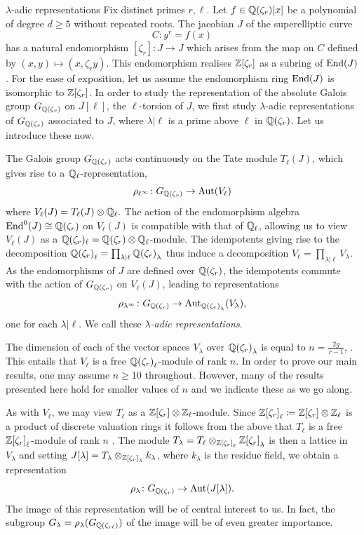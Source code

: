 \documentclass[11pt,a4paper]{article}
\newcommand{\Qr}{{\QQ(\zeta_r)}}
\newcommand{\Zr}{{\ZZ[\zeta_r]}}
\newcommand{\GQr}{G_{\QQ(\zeta_{r})}}
\newcommand{\GQrl}{G_{\QQ(\zeta_{r\ell})}}
\newcommand{\zr}{\zeta_r}
\newcommand{\Glam}{G_{\lambda}}
\begin{document}
\begin{section}{$\lambda$-adic representations}
\label{section_lambda_adic_reps}
Fix distinct primes $r , \ell$. Let $f \in \Qr[x]$ be a polynomial  of degree $d \geq 5$ without repeated roots. The jacobian $J$ of the superelliptic curve
$$C \colon y^r = f(x)$$
has a natural endomorphism $[\zr]\colon J \rightarrow J$ which arises from the map on $C$ defined by $(x,y) \mapsto (x,\zr y)$.
This endomorphism realises $\ZZ[\zr]$ as a subring of $\End(J)$.
For the ease of exposition, let us assume the endomorphism ring $\End(J)$ is isomorphic to $\Zr$.
In order to study the representation of the absolute Galois group $\GQr$ on $J[\ell]$, the $\ell$-torsion of $J$, we first study $\lambda$-adic representations of $\GQr$ associated to $J$, where $\lambda|\ell$ is a prime above $\ell$ in $\Qr$. Let us introduce these now.

The Galois group $\GQr$ acts continuously on the Tate module $T_\ell(J)$, which gives rise to a $\mathbb{Q}_\ell$-representation,
$$\rho_{\ell^\infty}  \colon \GQr \rightarrow \Aut(V_\ell) $$
where $V_\ell(J) = T_\ell(J) \otimes \mathbb{Q}_\ell.$
The action of the endomorphism algebra $\End^0(J) \cong \QQ(\zeta_r)$ on $V_\ell(J)$ is compatible with that of $\mathbb{Q}_\ell$, allowing us to view $V_\ell(J)$ as a $\QQ(\zeta_r)_\ell = \Qr \otimes \Ql$-module.
The idempotents giving rise to the decomposition $\Qr_\ell = \prod_{\lambda | \ell} \Qr_\lambda$ thus induce a decomposition $V_\ell = \prod_{\lambda | \ell} V_\lambda$.
As the endomorphisms of $J$ are defined over $\Qr$, the idempotents commute with the action of $\GQr$ on $V_\ell(J)$, leading to representations $$ \rho_{\lambda^\infty} \colon \GQr \rightarrow \Aut_{\Qr_\lambda}(V_\lambda),$$
one for each $\lambda|\ell$. We call these  \emph{$\lambda$-adic representations}. 




The dimension of each of the vector spaces $V_\lambda$ over $\Qr_\lambda$ is equal to $n=\frac{2g}{r-1}$, \cite[Thm 2.1.1]{ribet_RM}. This entails that $V_\ell$ is a free $\Qr_\ell$-module of rank $n$.
In order to prove our main results, one may assume $n \geq 10$ throughout.
However, many of the results presented here hold for smaller values of $n$ and we indicate these as we go along.

As with $V_\ell$, we may view $T_\ell$ as a $\Zr \otimes \Zl$-module. Since $\Zr_\ell \coloneqq \Zr \otimes \Zl$ is a product of discrete valuation rings it follows from the above that $T_\ell$ is a free  $\Zr_\ell$-module of rank $n$ \cite[Prop 2.2.1]{ribet_RM}. The module $T_\lambda = T_\ell \otimes_{ \Zr_\ell} \Zr_\lambda$ is then a lattice in $V_\lambda$ 
and setting $J[\lambda] =T_\lambda \otimes_{ \Zr_\lambda} k_\lambda  $, where $k_\lambda$ is the residue field, we obtain a representation
\[\rho_\lambda \colon \GQr \rightarrow \Aut(J[\lambda]).
\]
The image of this representation will be of central interest to us. In fact, the subgroup $\Glam = \rho_\lambda(\GQrl)$ of the image will be of even greater importance.


\end{section}
\end{document}
